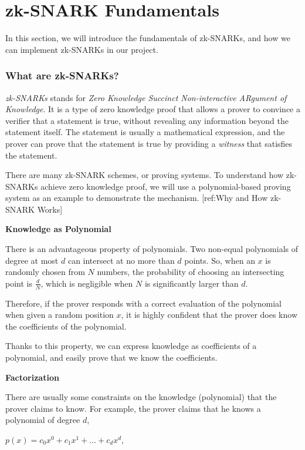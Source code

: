 \documentclass[
]{report}
\begin{document}
\section{zk-SNARK Fundamentals}

In this section, we will introduce the fundamentals of zk-SNARKs, and
how we can implement zk-SNARKs in our project.

\subsubsection{What are zk-SNARKs?}

\emph{zk-SNARKs} stands for \emph{Zero Knowledge Succinct
Non-interactive ARgument of Knowledge}. It is a type of zero knowledge
proof that allows a prover to convince a verifier that a statement is
true, without revealing any information beyond the statement itself. The
statement is usually a mathematical expression, and the prover can prove
that the statement is true by providing a \emph{witness} that satisfies
the statement.

There are many zk-SNARK schemes, or proving systems. To understand how
zk-SNARKs achieve zero knowledge proof, we will use a polynomial-based
proving system as an example to demonstrate the mechanism.
{[}ref:Why and How zk-SNARK Works{]}

\textbf{Knowledge as Polynomial}

There is an advantageous property of polynomials. Two non-equal
polynomials of degree at most \(d\) can intersect at no more than \(d\)
points. So, when an \(x\) is randomly chosen from \(N\) numbers, the
probability of choosing an intersecting point is \(\frac{d}{N}\), which
is negligible when \(N\) is significantly larger than \(d\).

Therefore, if the prover responds with a correct evaluation of the
polynomial when given a random position \(x\), it is highly confident
that the prover does know the coefficients of the polynomial.

Thanks to this property, we can express knowledge as coefficients of a
polynomial, and easily prove that we know the coefficients.

\textbf{Factorization}

There are usually some constraints on the knowledge (polynomial) that
the prover claims to know. For example, the prover claims that he knows
a polynomial of degree \(d\),

\(p(x) = c_{0}x^{0} + c_{1}x^{1} + \ldots + c_{d}x^{d}\),
\end{document}
